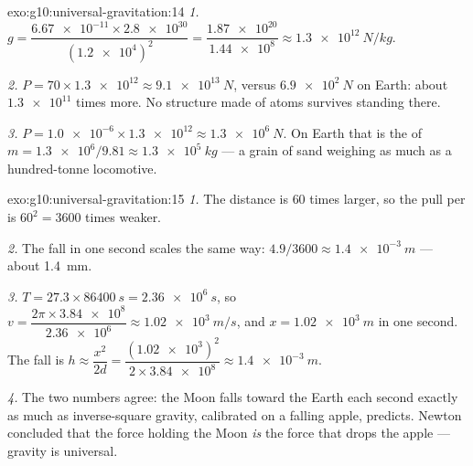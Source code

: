 \begin{solution}{exo:g10:universal-gravitation:14}
\emph{1.} $g = \dfrac{\num{6.67e-11} \times \num{2.8e30}}
{(\num{1.2e4})^2} = \dfrac{\num{1.87e20}}{\num{1.44e8}}
\approx \qty{1.3e12}{N/kg}.$

\emph{2.} $P = 70 \times \num{1.3e12} \approx \qty{9.1e13}{N}$, versus
$\qty{6.9e2}{N}$ on Earth: about $\num{1.3e11}$ times more. No
structure made of atoms survives standing there.

\emph{3.} $P = \num{1.0e-6} \times \num{1.3e12} \approx
\qty{1.3e6}{N}$. On Earth that is the  of
$m = \num{1.3e6}/9.81 \approx \qty{1.3e5}{kg}$ --- a grain of sand
weighing as much as a hundred-tonne locomotive.
\end{solution}

\begin{solution}{exo:g10:universal-gravitation:15}
\emph{1.} The distance is $60$ times larger, so the pull per 
is $60^2 = 3600$ times weaker.

\emph{2.} The fall in one second scales the same way:
$4.9/3600 \approx \qty{1.4e-3}{m}$ --- about \qty{1.4}{mm}.

\emph{3.} $T = 27.3 \times \qty{86400}{s} = \qty{2.36e6}{s}$, so
$v = \dfrac{2\pi \times \num{3.84e8}}{\num{2.36e6}} \approx
\qty{1.02e3}{m/s}$, and $x = \qty{1.02e3}{m}$ in one second. The fall
is $h \approx \dfrac{x^2}{2d}
= \dfrac{(\num{1.02e3})^2}{2 \times \num{3.84e8}}
\approx \qty{1.4e-3}{m}$.

\emph{4.} The two numbers agree: the Moon falls toward the Earth each
second exactly as much as inverse-square gravity, calibrated on a
falling apple, predicts. Newton concluded that the force holding the
Moon \emph{is} the force that drops the apple --- gravity is
universal.
\end{solution}

